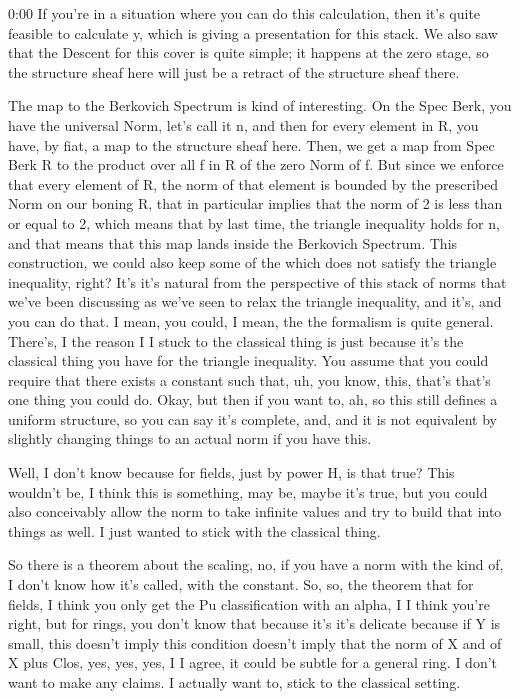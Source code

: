 \begin{unfinished}{0:00}
If you're in a situation where you can do this calculation, then it's quite feasible to calculate y, which is giving a presentation for this stack. We also saw that the Descent for this cover is quite simple; it happens at the zero stage, so the structure sheaf here will just be a retract of the structure sheaf there.

The map to the Berkovich Spectrum is kind of interesting. On the Spec Berk, you have the universal Norm, let's call it n, and then for every element in R, you have, by fiat, a map to the structure sheaf here. Then, we get a map from Spec Berk R to the product over all f in R of the zero Norm of f. But since we enforce that every element of R, the norm of that element is bounded by the prescribed Norm on our boning R, that in particular implies that the norm of 2 is less than or equal to 2, which means that by last time, the triangle inequality holds for n, and that means that this map lands inside the Berkovich Spectrum.
This construction, we could also keep some of the which does not satisfy the triangle inequality, right? It's it's natural from the perspective of this stack of norms that we've been discussing as we've seen to relax the triangle inequality, and it's, and you can do that. I mean, you could, I mean, the the formalism is quite general. There's, I the reason I I stuck to the classical thing is just because it's the classical thing you have for the triangle inequality. You assume that you could require that there exists a constant such that, uh, you know, this, that's that's one thing you could do. Okay, but then if you want to, ah, so this still defines a uniform structure, so you can say it's complete, and, and it is not equivalent by slightly changing things to an actual norm if you have this. 

Well, I don't know because for fields, just by power H, is that true? This wouldn't be, I think this is something, may be, maybe it's true, but you could also conceivably allow the norm to take infinite values and try to build that into things as well. I just wanted to stick with the classical thing.

So there is a theorem about the scaling, no, if you have a norm with the kind of, I don't know how it's called, with the constant. So, so, the theorem that for fields, I think you only get the Pu classification with an alpha, I I think you're right, but for rings, you don't know that because it's it's delicate because if Y is small, this doesn't imply this condition doesn't imply that the norm of X and of X plus Clos, yes, yes, yes, I I agree, it could be subtle for a general ring. I don't want to make any claims. I actually want to, stick to the classical setting.


\end{unfinished}
